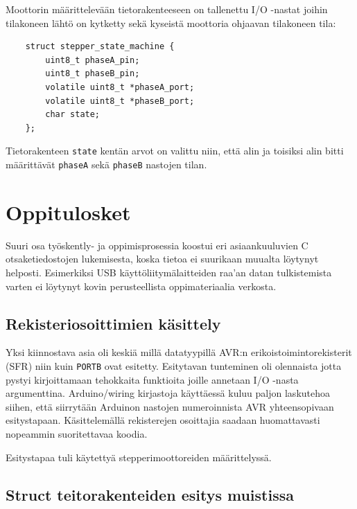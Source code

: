 \documentclass[]{article} %
\numberwithin{equation}{section}
\numberwithin{figure}{section}
\numberwithin{table}{section}
\begin{document}
Moottorin määrittelevään tietorakenteeseen on tallenettu I/O -nastat joihin tilakoneen lähtö on kytketty sekä kyseistä moottoria ohjaavan tilakoneen tila:

\begin{verbatim}
    struct stepper_state_machine {
        uint8_t phaseA_pin;
        uint8_t phaseB_pin;
        volatile uint8_t *phaseA_port;
        volatile uint8_t *phaseB_port;
        char state;
    };
\end{verbatim}

Tietorakenteen \verb+state+ kentän arvot on valittu niin, että alin ja toisiksi alin bitti määrittävät \verb+phaseA+ sekä \verb+phaseB+ nastojen tilan.

\section{Oppitulosket}
\label{sec:Oppitulosket}


Suuri osa työskently- ja oppimisprosessia koostui eri asiaankuuluvien C otsaketiedostojen lukemisesta, koska tietoa ei suurikaan muualta löytynyt helposti. 
Esimerkiksi USB käyttöliitymälaitteiden raa'an datan tulkistemista varten ei löytynyt kovin perusteellista oppimateriaalia verkosta.

\subsection{Rekisteriosoittimien käsittely}
\label{Rekisteriosoittimien kasittely}

Yksi kiinnostava asia oli keskiä millä datatyypillä AVR:n erikoistoimintorekisterit (SFR) niin kuin \verb+PORTB+ ovat esitetty.
Esitytavan tunteminen oli olennaista jotta pystyi kirjoittamaan tehokkaita funktioita joille annetaan I/O -nasta argumenttina. Arduino/wiring kirjastoja käyttäessä kuluu paljon laskutehoa siihen, että siirrytään Arduinon nastojen numeroinnista AVR yhteensopivaan esitystapaan. Käsittelemällä rekisterejen osoittajia saadaan huomattavasti nopeammin suoritettavaa koodia.

Esitystapaa tuli käytettyä stepperimoottoreiden määrittelyssä.



\subsection{Struct teitorakenteiden esitys muistissa}
\end{document}
